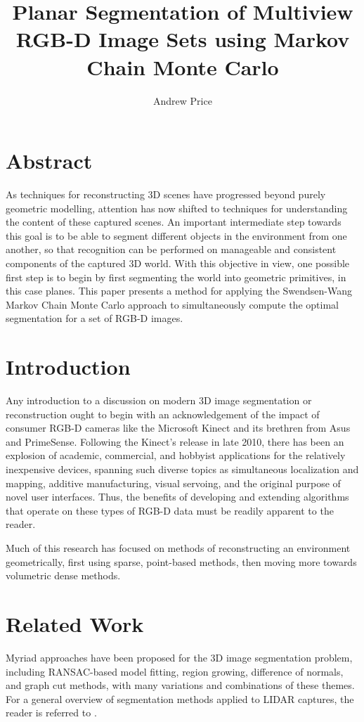 \documentclass[10pt,letterpaper]{article}
\author{Andrew Price}
\title{Planar Segmentation of Multiview RGB-D Image Sets using Markov Chain Monte Carlo }
\begin{document}
\maketitle

\section{Abstract}
	As techniques for reconstructing 3D scenes have progressed beyond purely geometric modelling, attention has now shifted to techniques for understanding the content of these captured scenes. An important intermediate step towards this goal is to be able to segment different objects in the environment from one another, so that recognition can be performed on manageable and consistent components of the captured 3D world. With this objective in view, one possible first step is to begin by first segmenting the world into geometric primitives, in this case planes. This paper presents a method for applying the Swendsen-Wang Markov Chain Monte Carlo approach to simultaneously compute the optimal segmentation for a set of RGB-D images.
		
\section{Introduction}
	Any introduction to a discussion on modern 3D image segmentation or reconstruction ought to begin with an acknowledgement of the impact of consumer RGB-D cameras like the Microsoft Kinect and its brethren from Asus and PrimeSense. Following the Kinect's release in late 2010, there has been an explosion of academic, commercial, and hobbyist applications for the relatively inexpensive devices, spanning such diverse topics as simultaneous localization and mapping, additive manufacturing, visual servoing, and the original purpose of novel user interfaces. Thus, the benefits of developing and extending algorithms that operate on these types of RGB-D data must be readily apparent to the reader.
	
	Much of this research has focused on methods of reconstructing an environment geometrically, first using sparse, point-based methods, then moving more towards volumetric dense methods.
	
\section{Related Work}
	Myriad approaches have been proposed for the 3D image segmentation problem, including RANSAC-based model fitting, region growing, difference of normals, and graph cut methods, with many variations and combinations of these themes. For a general overview of segmentation methods applied to LIDAR captures, the reader is referred to \cite{douillard2011segmentation}. 
	\cite{bleyer2005graph}
\end{document}

